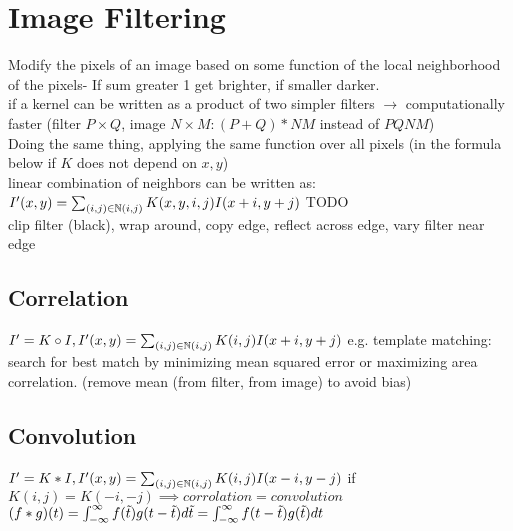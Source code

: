 \section*{Image Filtering}
Modify the pixels of an image based on some function of the local neighborhood of the pixels- If sum greater 1 get brighter, if smaller darker.\\
 if a kernel can be written as a product of two simpler filters $\rightarrow$ computationally faster (filter $P \times Q$, image $N \times M: (P + Q) * NM$ instead of $PQNM$)\\
 Doing the same thing, applying the same function over all pixels (in the formula below if $K$ does not depend on $x, y$)\\
 linear combination of neighbors can be written as: $I'(x, y) = \sum_{(i, j) \in \mathbb{N}(i, j)} K(x, y, i, j) I (x + i, y + j)$ TODO\\
 clip filter (black), wrap around, copy edge, reflect across edge, vary filter near edge
\subsection*{Correlation}
$I' = K \circ I, I'(x, y) = \sum_{(i, j) \in \mathbb{N}(i, j)} K(i, j) I (x + i, y + j)$ e.g. template matching: search for best match by minimizing mean squared error or maximizing area correlation. (remove mean (from filter, from image) to avoid bias)
\subsection*{Convolution}
$I' = K * I, I'(x, y) = \sum_{(i, j) \in \mathbb{N}(i, j)} K(i, j) I (x - i, y - j)$ if $K(i, j) = K (-i, -j) \implies corrolation = convolution$\\
 $(f * g)(t) \\
= \int_{-\infty}^{\infty} f(\tilde{t}) g(t - \tilde{t}) d\tilde{t}\\
= \int_{-\infty}^{\infty} f(t - \tilde{t}) g(\tilde{t}) dt$
